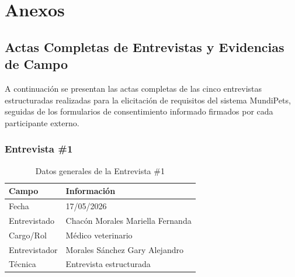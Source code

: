 \documentclass[journal,onecolumn]{IEEEtran}
\begin{document}
\newpage


\printbibliography[heading=bibnumbered, title={Referencias}]

\newpage

\section{Anexos}

\subsection{Actas Completas de Entrevistas y Evidencias de Campo}
\label{app:entrevistas}

A continuación se presentan las actas completas de las cinco entrevistas
estructuradas realizadas para la elicitación de requisitos del sistema
MundiPets, seguidas de los formularios de consentimiento informado firmados
por cada participante externo.

\subsubsection{Entrevista \#1}

\begin{table}[H]
\caption{Datos generales de la Entrevista \#1}
\label{tab:datos_e1}
\begin{tabularx}{\textwidth}{|p{4cm}|X|}
\hline
\textbf{Campo} & \textbf{Información} \\
\hline
Fecha & 17/05/2026 \\
\hline
Entrevistado & Chacón Morales Mariella Fernanda \\
\hline
Cargo/Rol & Médico veterinario \\
\hline
Entrevistador & Morales Sánchez Gary Alejandro \\
\hline
Técnica & Entrevista estructurada \\
\hline
\end{tabularx}
\end{table}
\end{document}
